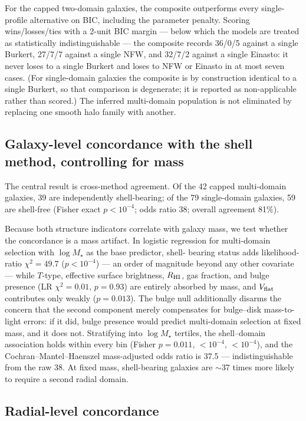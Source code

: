 \documentclass[twocolumn]{aastex701}
\newcommand{\vflat}{V_{\rm flat}}
\begin{document}
For the capped two-domain galaxies, the composite outperforms every
single-profile alternative on BIC, including the parameter penalty. Scoring
wins/losses/ties with a 2-unit BIC margin --- below which the models are treated
as statistically indistinguishable \citep[the][convention]{KassRaftery1995} ---
the composite records 36/0/5 against a
single Burkert, 27/7/7 against a single NFW, and 32/7/2 against a single
Einasto: it never loses to a single Burkert and loses to NFW or Einasto in at
most seven cases. (For single-domain galaxies the composite is by
construction identical to a single Burkert, so that comparison is degenerate;
it is reported as non-applicable rather than scored.)
The inferred multi-domain population is not eliminated by replacing one
smooth halo family with another.

\subsection{Galaxy-level concordance with the shell method, controlling for
mass} \label{sec:concordance}

The central result is cross-method agreement. Of the 42 capped multi-domain
galaxies, 39 are independently shell-bearing; of the 79 single-domain
galaxies, 59 are shell-free (Fisher exact $p < 10^{-4}$; odds ratio 38;
overall agreement 81\%).

Because both structure indicators correlate with galaxy mass, we test
whether the concordance is a mass artifact. In logistic regression for
multi-domain selection with $\log M_\star$ as the base predictor, shell-%
bearing status adds likelihood-ratio $\chi^2 = 49.7$ ($p < 10^{-4}$) ---
an order of magnitude beyond any other covariate --- while $T$-type,
effective surface brightness, $R_{\rm HI}$, gas fraction, and bulge presence
(LR $\chi^2 = 0.01$, $p = 0.93$) are entirely absorbed by mass, and
$\vflat$ contributes only weakly ($p = 0.013$). The bulge null additionally
disarms the concern that the second component merely compensates for
bulge--disk mass-to-light errors: if it did, bulge presence would predict
multi-domain selection at fixed mass, and it does not. Stratifying into $\log M_\star$ tertiles, the shell--domain
association holds within every bin (Fisher $p = 0.011$, $<10^{-4}$,
$<10^{-4}$), and the Cochran--Mantel--Haenszel mass-adjusted odds ratio is
37.5 --- indistinguishable from the raw 38. At fixed mass, shell-bearing
galaxies are $\sim$37 times more likely to require a second radial domain.

\subsection{Radial-level concordance} \label{sec:radial}
\end{document}
